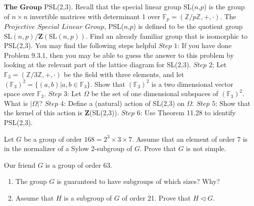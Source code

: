 \documentclass[12pt,letterpaper,boxed]{hmcpset}
\begin{document}

\begin{problem}[11.5.13]
$\textbf{The Group}$ PSL(2,3). Recall that the special linear group SL($n$,$p$) is the group of $n \times n$ invertible matrices with determinant 1 over $\mathbb{F}_p = (\mathbb{Z}/p\mathbb{Z}, +, \cdot)$. The $\textit{Projective Special Linear Group}$, PSL($n$,$p$) is defined to be the quotient group $\text{SL}(n,p)/\textbf{Z}(\text{SL}(n,p))$. Find an already familiar group that is isomorphic to PSL(2,3).
\newline You may find the following steps helpful
\newline
$\textit{Step 1}$: If you have done Problem 9.3.1, then you may be able to guess the answer to this problem by looking at the relevant part of the lattice diagram for SL(2,3).
\newline
$\textit{Step 2}$; Let $\mathbb{F}_3 = (\mathbb{Z}/3\mathbb{Z},+,\cdot)$ be the field with three elements, and let $(\mathbb{F}_3)^2 = \{(a,b) \vert a,b \in \mathbb{F}_3 \}$. Show that $(\mathbb{F}_3)^2$ is a two dimensional vector space over $\mathbb{F}_3$.
\newline
$\textit{Step 3}$: Let $\Omega$ be the set of one dimensional subspaces of $(\mathbb{F}_3)^2$. What is $\vert \Omega \vert$?
\newline
$\textit{Step 4}$: Define a (natural) action of SL(2,3) on $\Omega$.
\newline
$\textit{Step 5}$: Show that the kernel of this action is $\textbf{Z}$(SL(2,3)).
\newline
$\textit{Step 6}$: Use Theorem 11.28 to identify PSL(2,3).
\end{problem}

\begin{solution}
\end{solution}

\clearpage

\begin{problem}[12.2.8]
Let $G$ be a group of order $168 = 2^3 \times 3 \times 7$. Assume that an element of order 7 is in the normalizer of a Sylow 2-subgroup of $G$. Prove that $G$ is not simple. 
\end{problem}

\begin{solution}
\end{solution}

\clearpage

\begin{problem}[12.3.7]
Our friend $G$ is a group of order 63.
\begin{enumerate}[label=\alph*]
\item The group $G$ is guaranteed to have subgroups of which sizes? Why?
\item Assume that $H$ is a subgroup of $G$ of order 21. Prove that $H \triangleleft G$.
\end{enumerate}
\end{problem}
\end{document}
